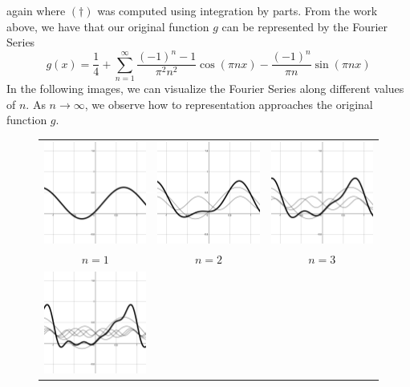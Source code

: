 \documentclass[11pt]{amsart}
\theoremstyle{plain}
\theoremstyle{definition}
\begin{document}
again where $(\dagger)$ was computed using integration by parts. From the work above, we have that our original function $g$ can be represented by the Fourier Series $$g(x) =\dfrac{1}{4} + \sum_{n=1}^\infty \dfrac{(-1)^n-1}{\pi^2 n^2}\cos(\pi nx) - \dfrac{(-1)^n}{\pi n}\sin(\pi nx)$$
In the following images, we can visualize the Fourier Series along different values of $n$. As $n\to\infty$, we observe how to representation approaches the original function $g$. 
\begin{figure}[ht!]
\centering
\begin{tabular}{ccc}
  \includegraphics[width=40mm]{Images/complex_1.png} &
  \includegraphics[width=40mm]{Images/complex_2.png} &
  \includegraphics[width=40mm]{Images/complex_3.png} \\
  $n=1$ & $n=2$ & $n=3$\\[6pt]
  \includegraphics[width=40mm]{Images/complex_5.png} &

\end{tabular}
\end{figure}
\end{document}
